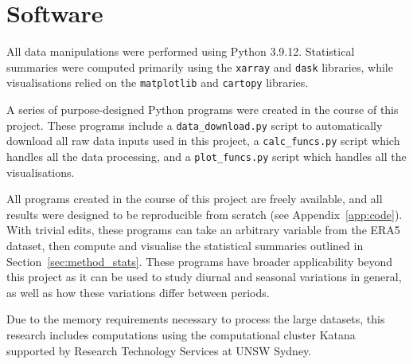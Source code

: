 \section{Software}

All data manipulations were performed using Python 3.9.12. Statistical summaries were computed primarily using the \verb+xarray+ \citep{xarray} and \verb+dask+ \citep{dask} libraries, while visualisations relied on the \verb+matplotlib+ \citep{matplotlib} and \verb+cartopy+ \citep{cartopy} libraries.

A series of purpose-designed Python programs were created in the course of this project. These programs include a \verb+data_download.py+ script to automatically download all raw data inputs used in this project, a \verb+calc_funcs.py+ script which handles all the data processing, and a \verb+plot_funcs.py+ script which handles all the visualisations. 

All programs created in the course of this project are freely available, and all results were designed to be reproducible from scratch (see Appendix~\ref{app:code}). With trivial edits, these programs can take an arbitrary variable from the ERA5 dataset, then compute and visualise the statistical summaries outlined in Section~\ref{sec:method_stats}. These programs have broader applicability beyond this project as it can be used to study diurnal and seasonal variations in general, as well as how these variations differ between periods.

Due to the memory requirements necessary to process the large datasets, this research includes computations using the computational cluster Katana supported by Research Technology Services at \ac{UNSW} Sydney.